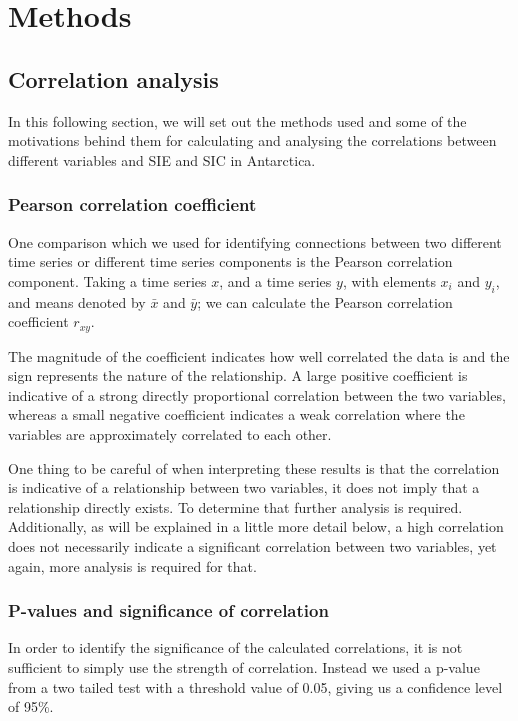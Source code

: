 \documentclass[../main.tex]{subfiles}
\begin{document}
\chapter{Methods}

\section{Correlation analysis}
\label{Methods:pearson}

In this following section, we will set out the methods used and some of the motivations behind them for calculating and analysing the correlations between different variables and SIE and SIC in Antarctica.

\subsection{Pearson correlation coefficient}
One comparison which we used for identifying connections between two different time series or different time series components is the Pearson correlation component. Taking a time series $x$, and a time series $y$, with elements $x_i$ and $y_i$, and means denoted by $\bar{x}$ and $\bar{y}$; we can calculate the Pearson correlation coefficient $r_{xy}$.



The magnitude of the coefficient indicates how well correlated the data is and the sign represents the nature of the relationship. A large positive coefficient is indicative of a strong directly proportional correlation between the two variables, whereas a small negative coefficient indicates a weak correlation where the variables are approximately correlated to each other.

One thing to be careful of when interpreting these results is that the correlation is indicative of a relationship between two variables, it does not imply that a relationship directly exists. To determine that further analysis is required. Additionally, as will be explained in a little more detail below, a high correlation does not necessarily indicate a significant correlation between two variables, yet again, more analysis is required for that.

\subsection{P-values and significance of correlation}
In order to identify the significance of the calculated correlations, it is not sufficient to simply use the strength of correlation. Instead we used a p-value from a two tailed test with a threshold value of 0.05, giving us a confidence level of 95\%.
\end{document}
